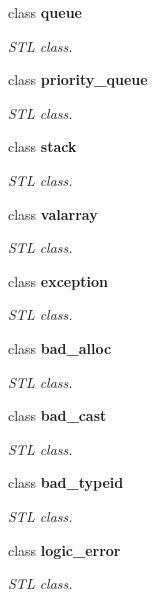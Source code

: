 \begin{CompactItemize}
class \textbf{queue}
\begin{CompactList}\small\item\em STL class. \item\end{CompactList}\item 
class \textbf{priority\_\-queue}
\begin{CompactList}\small\item\em STL class. \item\end{CompactList}\item 
class \textbf{stack}
\begin{CompactList}\small\item\em STL class. \item\end{CompactList}\item 
class \textbf{valarray}
\begin{CompactList}\small\item\em STL class. \item\end{CompactList}\item 
class \textbf{exception}
\begin{CompactList}\small\item\em STL class. \item\end{CompactList}\item 
class \textbf{bad\_\-alloc}
\begin{CompactList}\small\item\em STL class. \item\end{CompactList}\item 
class \textbf{bad\_\-cast}
\begin{CompactList}\small\item\em STL class. \item\end{CompactList}\item 
class \textbf{bad\_\-typeid}
\begin{CompactList}\small\item\em STL class. \item\end{CompactList}\item 
class \textbf{logic\_\-error}
\begin{CompactList}\small\item\em STL class. \item\end{CompactList}\item 

\end{CompactItemize}
